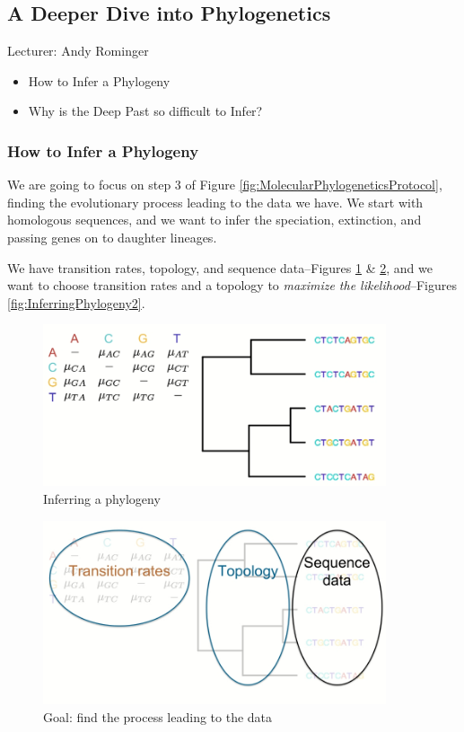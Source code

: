 \documentclass[]{article}
\begin{document}
\subsection{A Deeper Dive into Phylogenetics}

Lecturer: Andy Rominger
\begin{itemize}
	\item How to Infer a Phylogeny
	\item Why is the Deep Past so difficult to Infer?
\end{itemize}

\subsubsection{How to Infer a Phylogeny}
We are going to focus on step 3 of Figure \ref{fig:MolecularPhylogeneticsProtocol}, finding the evolutionary process leading to the data we have. We start with homologous sequences, and we want to infer the speciation, extinction, and passing genes on to daughter lineages.

We have transition rates, topology, and sequence data--Figures \ref{fig:InferringPhylogeny} \& \ref{fig:InferringPhylogeny1}, and we want to choose transition rates and a topology to \textit{maximize the likelihood}--Figures \ref{fig:InferringPhylogeny2}. 

\begin{figure}[H]
	\caption{Inferring a phylogeny}\label{fig:InferringPhylogeny}
	\includegraphics[width=0.9\textwidth]{InferringPhylogeny}
\end{figure}

\begin{figure}[H]
	\caption{Goal: find the process leading to the data}\label{fig:InferringPhylogeny1}
	\includegraphics[width=0.9\textwidth]{InferringPhylogeny1}
\end{figure}
\end{document}
